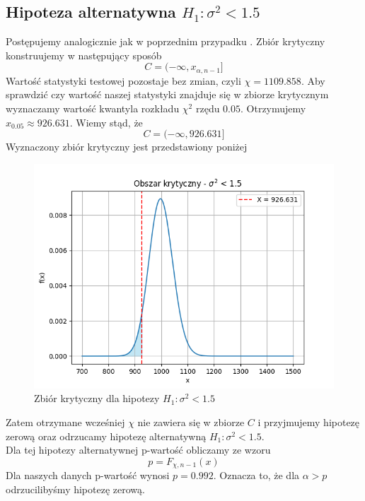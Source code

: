 \documentclass{article}
\begin{document}
\subsection{Hipoteza alternatywna $H_{1}: \sigma^{2}<1.5$}
Postępujemy analogicznie jak w poprzednim przypadku . Zbiór krytyczny konstruujemy w następujący sposób
\begin{equation}
C = (-\infty, x_{\alpha,n-1}]
\end{equation}
Wartość statystyki testowej pozostaje bez zmian, czyli $\chi=1109.858$. Aby sprawdzić czy wartość naszej statystyki znajduje się w zbiorze krytycznym wyznaczamy wartość kwantyla rozkładu $\chi^{2}$ rzędu $0.05$. Otrzymujemy $x_{0.05}\approx926.631$. Wiemy stąd, że 
\begin{equation}
C = (-\infty,926.631]
\end{equation}
Wyznaczony zbiór krytyczny jest przedstawiony poniżej
\begin{figure}[H]
    \centering
    \includegraphics[scale=0.5]{sig_l.png}
    \caption{Zbiór krytyczny dla hipotezy $H_{1}:\sigma^{2}<1.5$}
    \label{fig:6}
\end{figure}
Zatem otrzymane wcześniej $\chi$ nie zawiera się w zbiorze $C$ i przyjmujemy hipotezę zerową oraz odrzucamy hipotezę alternatywną $H_{1}:\sigma^{2}<1.5$.\\
Dla tej hipotezy alternatywnej p-wartość obliczamy ze wzoru
\begin{equation}
    p = F_{\chi,n-1}(x)
\end{equation}
Dla naszych danych p-wartość wynosi $p=0.992$. Oznacza to, że dla $\alpha>p$ odrzucilibyśmy hipotezę zerową.
\end{document}
